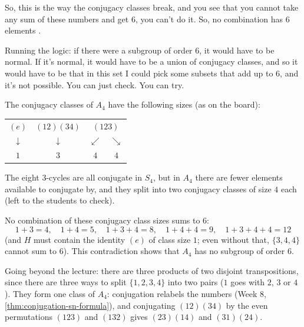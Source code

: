 \begin{proofWrapper}
\begin{speech}[00:18:45 - 00:20:42]
So, this is the way the conjugacy classes break, and you see that you cannot take any sum of these numbers and get $6$, you can't do it. So, no combination has $6$ elements .

Running the logic: if there were a subgroup of order $6$, it would have to be normal. If it's normal, it would have to be a union of conjugacy classes, and so it would have to be that in this set I could pick some subsets that add up to $6$, and it's not possible. You can just check. You can try.
\end{speech}

\begin{content}
The conjugacy classes of $A_4$ have the following sizes (as on the board):
\begin{center}
\begin{tabular}{c c c c}
\toprule
$(e)$ & $(12)(34)$ & \multicolumn{2}{c}{$(123)$} \\
$\downarrow$ & $\downarrow$ & $\swarrow$ & $\searrow$ \\
$1$ & $3$ & $4$ & $4$ \\
\bottomrule
\end{tabular}
\end{center}
The eight $3$-cycles are all conjugate in $S_4$, but in $A_4$ there are fewer elements available to conjugate by, and they split into two conjugacy classes of size $4$ each (left to the students to check).

No combination of these conjugacy class sizes sums to $6$:
\[
1 + 3 = 4, \quad 1 + 4 = 5, \quad 1 + 3 + 4 = 8, \quad 1 + 4 + 4 = 9, \quad 1 + 3 + 4 + 4 = 12
\]
(and $H$ must contain the identity $(e)$ of class size $1$; even without that, $\{3, 4, 4\}$ cannot sum to $6$). This contradiction shows that $A_4$ has no subgroup of order $6$.

\begin{steps}
Going beyond the lecture: there are three products of two disjoint transpositions, since there are three ways to split $\{1, 2, 3, 4\}$ into two pairs ($1$ goes with $2$, $3$ or $4$). They form one class of $A_4$: conjugation relabels the numbers (Week 8, \cref{thm:conjugation-sn-formula}), and conjugating $(12)(34)$ by the even permutations $(123)$ and $(132)$ gives $(23)(14)$ and $(31)(24)$.


\end{steps}
\end{content}
\end{proofWrapper}
